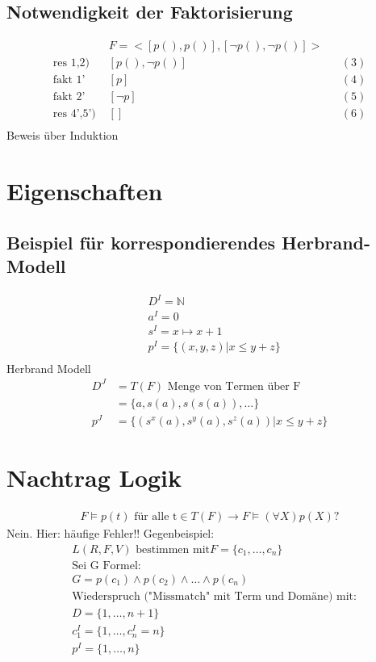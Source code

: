 \subsection{Notwendigkeit der Faktorisierung}
\begin{align*}
	&F = < [p(), p()], [\neg p(), \neg p()]>\\
	\text{res 1,2) }& [p(), \neg p()] &&(3) \\
	\text{fakt 1' }& [p] &&(4)\\
	\text{fakt 2' }& [\neg p] &&(5)\\
	\text{res 4',5') }& [] &&(6)\\
\end{align*}
Beweis über Induktion
\section{Eigenschaften}
\subsection{Beispiel für korrespondierendes Herbrand-Modell}
\begin{align*}
	&D^I = \mathbb{N}\\
	&a^I = 0\\
	&s^I = x \mapsto x + 1\\
	&p^I = \{(x,y,z)|x \le y + z\}\\
\end{align*}
Herbrand Modell
\begin{align*}
	D^J &= T(F) \text{ Menge von Termen über F}\\
	&= \{a, s(a), s(s(a)), \ldots \} \\
	p^J &= \{(s^x(a), s^y(a), s^z(a))|x \le y + z\}
\end{align*}
\section{Nachtrag Logik}
\begin{align*}
	F \vDash p(t) \text{ für alle t}\in T(F) \to F \vDash (\forall X)p(X) ?
\end{align*}
Nein. Hier: häufige Fehler!! Gegenbeispiel:
\begin{align*}
	&L(R,F,V) \text{ bestimmen mit} F = \{c_1, \ldots, c_n\}\\
	&\text{Sei G Formel:}\\
	&G = p(c_1) \wedge p(c_2) \wedge \ldots \wedge p(c_n)\\
	&\text{Wiederspruch ("Missmatch" mit Term und Domäne) mit:}\\
	&D = \{1, \ldots , n+1\}\\
	&c_1^I = \{1, \ldots, c_n^I = n\}\\
	&p^I = \{1, \ldots, n\}
\end{align*}


